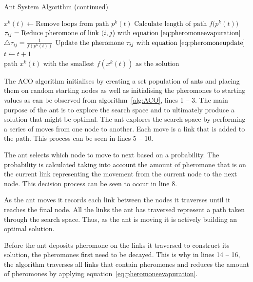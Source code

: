 \begin{algorithm}[H]
\caption{Ant System Algorithm (continued)}
\label{alg:ACO1}
	\begin{algorithmic}
			\State$x^k(t) \leftarrow \text{Remove loops from path }p^k(t)$
			\State$\text{Calculate length of path $f(p^k(t)$})$
		\EndFor
			\State$\tau_{ij} = \text{Reduce pheromone of link $(i,j)$ with equation~\ref{eq:pheromoneevapuration}}$
		\EndFor
				\State$\triangle \tau_{ij} = \frac{1}{f(p^k(t))}$
				\State$\text{Update the pheromone $\tau_{ij}$ with equation~\ref{eq:pheromoneupdate}}$
			\EndFor
		\EndFor
		\State$t \leftarrow t + 1$
	\EndWhile\\
	\Return $\text{path $x^k(t)$ with the smallest $f(x^k(t))$ as the solution}$
	\end{algorithmic}
\end{algorithm}

The \gls{ACO} algorithm initialises by creating a set population of ants and placing them on random starting nodes as well as initialising the pheromones to starting values as can be observed from algorithm~\ref{alg:ACO}, lines 1 -- 3. The main purpose of the ant is to explore the search space and to ultimately produce a solution that might be optimal. The ant explores the search space by performing a series of moves from one node to another. Each move is a link that is added to the path. This process can be seen in lines 5 -- 10.

The ant selects which node to move to next based on a probability. The probability is calculated taking into account the amount of pheromone that is on the current link representing the movement from the current node to the next node\cite{CompuIntelligenceIntro,FundamentalSwarm}. This decision process can be seen to occur in line 8.

As the ant moves it records each link between the nodes it traverses until it reaches the final node. All the links the ant has traversed represent a path taken through the search space\cite{CompuIntelligenceIntro,FundamentalSwarm}. Thus, as the ant is moving it is actively building an optimal solution.

Before the ant deposits pheromone on the links it traversed to construct its solution, the pheromones first need to be decayed. This is why in lines 14 -- 16, the algorithm traverses all links that contain pheromones and reduces the amount of pheromones by applying equation~\ref{eq:pheromoneevapuration}.

